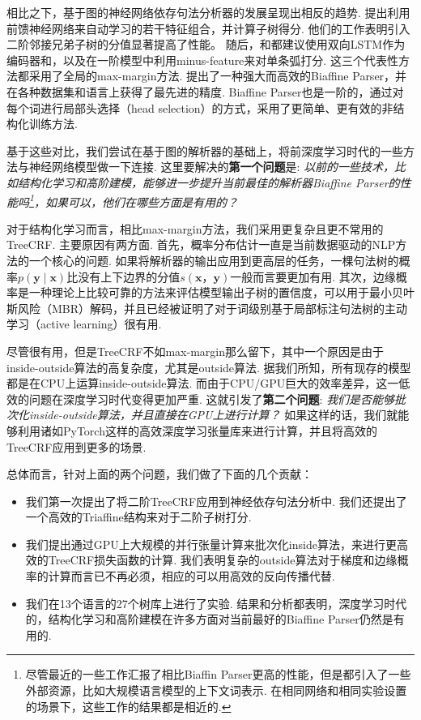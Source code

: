 相比之下，基于图的神经网络依存句法分析器的发展呈现出相反的趋势.
\cite{pei-etal-2015-effective}提出利用前馈神经网络来自动学习\cite{chen-manning-2014-fast}的若干特征组合，并计算子树得分.
他们的工作表明引入二阶邻接兄弟子树的分值显著提高了性能。
随后，\cite{wang-chang-2016-graph}和\cite{kiperwasser-goldberg-2016-simple}都建议使用双向LSTM作为编码器和，以及在一阶模型中利用minus-feature来对单条弧打分.
这三个代表性方法都采用了全局的max-margin方法.
\cite{Timothy-d17-biaffine}提出了一种强大而高效的Biaffine Parser，并在各种数据集和语言上获得了最先进的精度.
Biaffine Parser也是一阶的，通过对每个词进行局部头选择（head selection）的方式\cite{zhang-etal-2017-dependency-parsing}，采用了更简单、更有效的非结构化训练方法.

基于这些对比，我们尝试在基于图的解析器的基础上，将前深度学习时代的一些方法与神经网络模型做一下连接.
这里要解决的\textbf{第一个问题}是:
\emph{以前的一些技术，比如结构化学习和高阶建模，能够进一步提升当前最佳的解析器Biaffine Parser的性能吗\footnote{
        尽管最近的一些工作汇报了相比Biaffin Parser更高的性能，但是都引入了一些外部资源，比如大规模语言模型的上下文词表示. 在相同网络和相同实验设置的场景下，这些工作的结果都是相近的.
    }，如果可以，他们在哪些方面是有用的？}

对于结构化学习而言，相比max-margin方法，我们采用更复杂且更不常用的TreeCRF.
主要原因有两方面.
首先，概率分布估计一直是当前数据驱动的NLP方法的一个核心的问题\cite{le-zuidema-2014-inside}.
如果将解析器的输出应用到更高层的任务，一棵句法树的概率$p(\boldsymbol{y}\mid\boldsymbol{x})$比没有上下边界的分值$s (\boldsymbol{x}，\boldsymbol{y})$一般而言要更加有用.
其次，边缘概率是一种理论上比较可靠的方法来评估模型输出子树的置信度，可以用于最小贝叶斯风险（MBR）解码\cite{smith-smith-2007-probabilistic}，并且已经被证明了对于词级别基于局部标注句法树的主动学习（active learning）\cite{li-etal-2016-active}很有用.

尽管很有用，但是TreeCRF不如max-margin那么留下，其中一个原因是由于inside-outside算法的高复杂度，尤其是outside算法.
据我们所知，所有现存的模型都是在CPU上运算inside-outside算法.
而由于CPU/GPU巨大的效率差异，这一低效的问题在深度学习时代变得更加严重.
这就引发了\textbf{第二个问题}:
\emph{我们是否能够批次化inside-outside算法，并且直接在GPU上进行计算？}
如果这样的话，我们就能够利用诸如PyTorch这样的高效深度学习张量库来进行计算，并且将高效的TreeCRF应用到更多的场景\cite{cai-etal-2017-crf,le-zuidema-2014-inside}.

总体而言，针对上面的两个问题，我们做了下面的几个贡献：
\begin{itemize}%
    \item 我们第一次提出了将二阶TreeCRF应用到神经依存句法分析中.
          我们还提出了一个高效的Triaffine结构来对于二阶子树打分.
    \item 我们提出通过GPU上大规模的并行张量计算来批次化inside算法，来进行更高效的TreeCRF损失函数的计算.
          我们表明复杂的outside算法对于梯度和边缘概率的计算而言已不再必须，相应的可以用高效的反向传播代替.
    \item 我们在13个语言的27个树库上进行了实验.
          结果和分析都表明，深度学习时代的，结构化学习和高阶建模在许多方面对当前最好的Biaffine Parser仍然是有用的.
\end{itemize}

